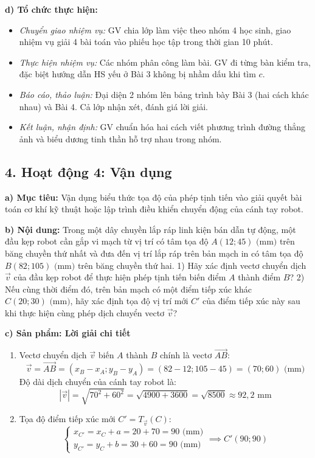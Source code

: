 \documentclass[12pt, a4paper]{article}
\renewcommand{\vec}[1]{\overrightarrow{#1}}
\begin{document}
\noindent \textbf{d) Tổ chức thực hiện:}  
\begin{itemize}[leftmargin=0.8cm]  
    \item \textit{Chuyển giao nhiệm vụ:} GV chia lớp làm việc theo nhóm 4 học sinh, giao nhiệm vụ giải 4 bài toán vào phiếu học tập trong thời gian 10 phút.  
    \item \textit{Thực hiện nhiệm vụ:} Các nhóm phân công làm bài. GV đi từng bàn kiểm tra, đặc biệt hướng dẫn HS yếu ở Bài 3 không bị nhầm dấu khi tìm $c$.  
    \item \textit{Báo cáo, thảo luận:} Đại diện 2 nhóm lên bảng trình bày Bài 3 (hai cách khác nhau) và Bài 4. Cả lớp nhận xét, đánh giá lời giải.  
    \item \textit{Kết luận, nhận định:} GV chuẩn hóa hai cách viết phương trình đường thẳng ảnh và biểu dương tinh thần hỗ trợ nhau trong nhóm.  
\end{itemize}  
  
\subsection*{4. Hoạt động 4: Vận dụng}  
  
\noindent \textbf{a) Mục tiêu:}  
Vận dụng biểu thức tọa độ của phép tịnh tiến vào giải quyết bài toán cơ khí kỹ thuật hoặc lập trình điều khiển chuyển động của cánh tay robot.  
  
\noindent \textbf{b) Nội dung:}  
Trong một dây chuyền lắp ráp linh kiện bán dẫn tự động, một đầu kẹp robot cần gắp vi mạch từ vị trí có tâm tọa độ $A(12; 45)\text{ (mm)}$ trên băng chuyền thứ nhất và đưa đến vị trí lắp ráp trên bản mạch in có tâm tọa độ $B(82; 105)\text{ (mm)}$ trên băng chuyền thứ hai.  
1) Hãy xác định vectơ chuyển dịch $\vec{v}$ của đầu kẹp robot để thực hiện phép tịnh tiến biến điểm $A$ thành điểm $B$?  
2) Nếu cùng thời điểm đó, trên bản mạch có một điểm tiếp xúc khác $C(20; 30)\text{ (mm)}$, hãy xác định tọa độ vị trí mới $C'$ của điểm tiếp xúc này sau khi thực hiện cùng phép dịch chuyển vectơ $\vec{v}$?  
  
\noindent \textbf{c) Sản phẩm: Lời giải chi tiết}  
\begin{enumerate}[leftmargin=0.6cm]  
    \item Vectơ chuyển dịch $\vec{v}$ biến $A$ thành $B$ chính là vectơ $\vec{AB}$:  
    $$\vec{v} = \vec{AB} = (x_B - x_A; y_B - y_A) = (82 - 12; 105 - 45) = (70; 60)\text{ (mm)}$$  
    Độ dài dịch chuyển của cánh tay robot là:  
    $$|\vec{v}| = \sqrt{70^2 + 60^2} = \sqrt{4900 + 3600} = \sqrt{8500} \approx 92{,}2\text{ mm}$$  
    \item Tọa độ điểm tiếp xúc mới $C' = T_{\vec{v}}(C)$:  
    $$\begin{cases} x_{C'} = x_C + a = 20 + 70 = 90\text{ (mm)} \\ y_{C'} = y_C + b = 30 + 60 = 90\text{ (mm)} \end{cases} \implies C'(90; 90)$$  
\end{enumerate}  
  
\end{document}
